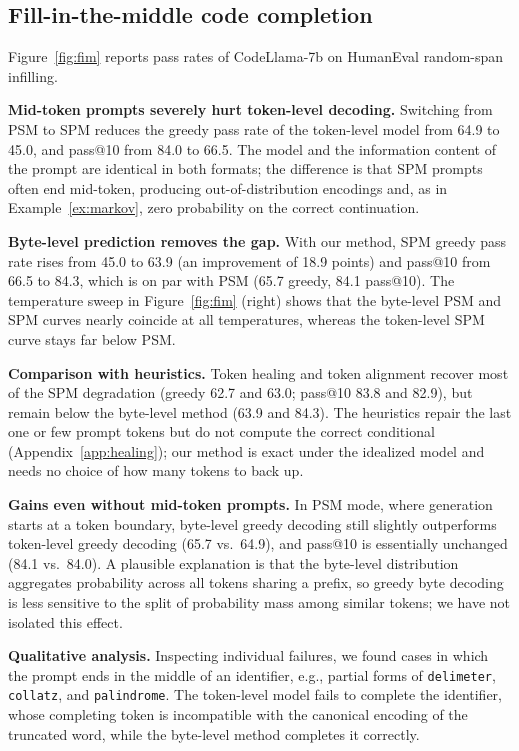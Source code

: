 \documentclass{article} %
\newcommand{\str}[1]{\texttt{#1}}
\begin{document}
\subsection{Fill-in-the-middle code completion}
\label{sec:exp_fim}
Figure~\ref{fig:fim} reports pass rates of CodeLlama-7b on HumanEval random-span infilling.

\textbf{Mid-token prompts severely hurt token-level decoding.} Switching from PSM to SPM reduces the greedy pass rate of the token-level model from 64.9 to 45.0, and pass@10 from 84.0 to 66.5. The model and the information content of the prompt are identical in both formats; the difference is that SPM prompts often end mid-token, producing out-of-distribution encodings and, as in Example~\ref{ex:markov}, zero probability on the correct continuation.

\textbf{Byte-level prediction removes the gap.} With our method, SPM greedy pass rate rises from 45.0 to 63.9 (an improvement of 18.9 points) and pass@10 from 66.5 to 84.3, which is on par with PSM (65.7 greedy, 84.1 pass@10). The temperature sweep in Figure~\ref{fig:fim} (right) shows that the byte-level PSM and SPM curves nearly coincide at all temperatures, whereas the token-level SPM curve stays far below PSM.

\textbf{Comparison with heuristics.} Token healing and token alignment recover most of the SPM degradation (greedy 62.7 and 63.0; pass@10 83.8 and 82.9), but remain below the byte-level method (63.9 and 84.3). The heuristics repair the last one or few prompt tokens but do not compute the correct conditional (Appendix~\ref{app:healing}); our method is exact under the idealized model and needs no choice of how many tokens to back up.

\textbf{Gains even without mid-token prompts.} In PSM mode, where generation starts at a token boundary, byte-level greedy decoding still slightly outperforms token-level greedy decoding (65.7 vs.\ 64.9), and pass@10 is essentially unchanged (84.1 vs.\ 84.0). A plausible explanation is that the byte-level distribution aggregates probability across all tokens sharing a prefix, so greedy byte decoding is less sensitive to the split of probability mass among similar tokens; we have not isolated this effect.

\textbf{Qualitative analysis.} Inspecting individual failures, we found cases in which the prompt ends in the middle of an identifier, e.g., partial forms of \str{delimeter}, \str{collatz}, and \str{palindrome}. The token-level model fails to complete the identifier, whose completing token is incompatible with the canonical encoding of the truncated word, while the byte-level method completes it correctly.
\end{document}
